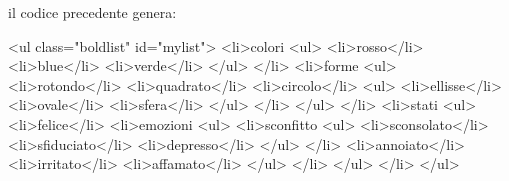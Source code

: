 
il codice precedente genera:

\begin{code}
<ul class="boldlist" id="mylist">
  <li>colori
    <ul>
      <li>rosso</li>
      <li>blue</li>
      <li>verde</li>
    </ul>
  </li>
  <li>forme
    <ul>
      <li>rotondo</li>
      <li>quadrato</li>
      <li>circolo</li>
        <ul>
          <li>ellisse</li>
          <li>ovale</li>
          <li>sfera</li>
        </ul>
      </li>
    </ul>
  </li>
  <li>stati
    <ul>
      <li>felice</li>
      <li>emozioni
        <ul>
          <li>sconfitto
            <ul>
              <li>sconsolato</li>
              <li>sfiduciato</li>
              <li>depresso</li>
            </ul>
          </li>
          <li>annoiato</li>
          <li>irritato</li>
          <li>affamato</li>
        </ul>
      </li>
    </ul>
  </li>
</ul>
\end{code}

